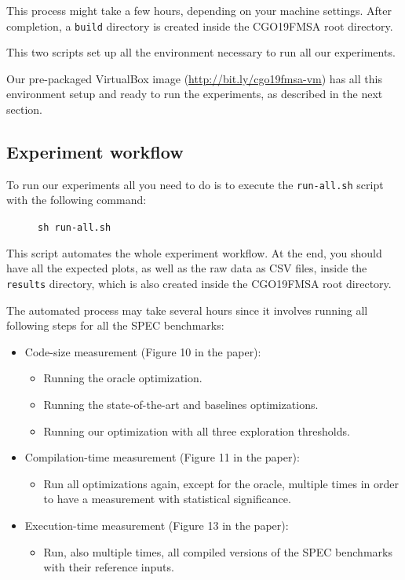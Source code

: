 \documentclass{sigplanconf}
\begin{document}
{This process might take a few hours, depending on your machine settings.
After completion, a \texttt{build} directory is created inside the CGO19FMSA
root directory.

This two scripts set up all the environment necessary to run all our experiments.

Our pre-packaged VirtualBox image (\url{http://bit.ly/cgo19fmsa-vm})
has all this environment setup and ready to run the experiments, as described
in the next section.

\subsection{Experiment workflow}

To run our experiments all you need to do is to execute the \texttt{run-all.sh} script
with the following command:
\begin{figure}[h]
\texttt{sh run-all.sh}
\end{figure}

This script automates the whole experiment workflow.
At the end, you should have all the expected plots, as well as the raw data as CSV files,
inside the \texttt{results} directory, which is also created inside the CGO19FMSA
root directory.

The automated process may take several hours since it involves running all following steps for all the SPEC benchmarks:

\noindent{}
\begin{itemize}
  \item Code-size measurement (Figure 10 in the paper):
\begin{itemize}
  \item Running the oracle optimization.
  \item Running the state-of-the-art and baselines optimizations.
  \item Running our optimization with all three exploration thresholds.
\end{itemize}
  \item Compilation-time measurement (Figure 11 in the paper):
\begin{itemize}
  \item Run all optimizations again, except for the oracle, multiple times in order to have a measurement with statistical significance.
\end{itemize}
  \item Execution-time measurement (Figure 13 in the paper):
\begin{itemize}
  \item Run, also multiple times, all compiled versions of the SPEC benchmarks with their reference inputs.
\end{itemize}
\end{itemize}


}
\end{document}
